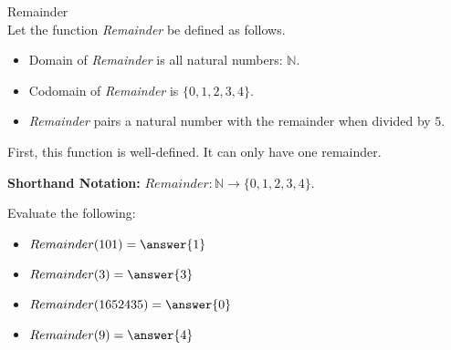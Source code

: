 \documentclass{ximera}
\begin{document}
\begin{example} Remainder \\

Let the function \textit{Remainder} be defined as follows.


\begin{itemize}
\item Domain of \textit{Remainder} is all natural numbers: $\mathbb{N}$.
\item Codomain of \textit{Remainder} is $\{ 0, 1, 2, 3, 4 \}$.
\item \textit{Remainder} pairs a natural number with the remainder when divided by $5$.
\end{itemize}


First, this function is well-defined. It can only have one remainder.


\textbf{Shorthand Notation: } $Remainder: \mathbb{N} \rightarrow \{ 0, 1, 2, 3, 4 \}$.

\begin{question}
Evaluate the following:

\begin{itemize}
	\item $Remainder(101) = \answer{1}$
	\item $Remainder(3) = \answer{3}$
	\item $Remainder(1652435) = \answer{0}$
	\item $Remainder(9) = \answer{4}$
\end{itemize}

\end{question}



\end{example}
\end{document}
